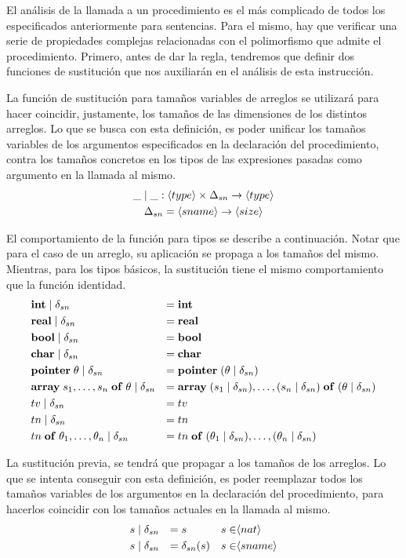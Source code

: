 \documentclass{article}
\begin{document}
El análisis de la llamada a un procedimiento es el más complicado de todos los especificados anteriormente para sentencias.
Para el mismo, hay que verificar una serie de propiedades complejas relacionadas con el polimorfismo que admite el procedimiento.
Primero, antes de dar la regla, tendremos que definir dos funciones de sustitución que nos auxiliarán en el análisis de esta instrucción.

La función de sustitución para tamaños variables de arreglos se utilizará para hacer coincidir, justamente, los tamaños de las dimensiones de los distintos arreglos.
Lo que se busca con esta definición, es poder unificar los tamaños variables de los argumentos especificados en la declaración del procedimiento, contra los tamaños concretos en los tipos de las expresiones pasadas como argumento en la llamada al mismo.
\begin{gather*}
\_ \mid \_ : \langle type \rangle \times \Delta_{sn} \rightarrow \langle type \rangle
\\
\Delta_{sn} = \langle sname \rangle \rightarrow \langle size \rangle
\end{gather*}

El comportamiento de la función para tipos se describe a continuación.
Notar que para el caso de un arreglo, su aplicación se propaga a los tamaños del mismo.
Mientras, para los tipos básicos, la sustitución tiene el mismo comportamiento que la función identidad.
\begin{align*}
&\mathbf{int} \mid \delta_{sn}
&=&\;
\mathbf{int}
\\
&\mathbf{real} \mid \delta_{sn}
&=&\;
\mathbf{real}
\\
&\mathbf{bool} \mid \delta_{sn}
&=&\;
\mathbf{bool}
\\
&\mathbf{char} \mid \delta_{sn}
&=&\;
\mathbf{char}
\\
&\mathbf{pointer} \; \theta \mid \delta_{sn}
&=&\;
\mathbf{pointer} \; (\theta \mid \delta_{sn})
\\
&\mathbf{array} \; s_1, \ldots, s_n \; \mathbf{of} \; \theta \mid \delta_{sn}
&=&\;
\mathbf{array} \; (s_1 \mid \delta_{sn}), \ldots, (s_n \mid \delta_{sn}) \; \mathbf{of} \; (\theta \mid \delta_{sn})
\\
&tv \mid \delta_{sn}
&=&\;
tv
\\
&tn \mid \delta_{sn}
&=&\;
tn
\\
&tn \; \mathbf{of} \; \theta_1, \ldots, \theta_n \mid \delta_{sn}
&=&\;
tn \; \mathbf{of} \; (\theta_1 \mid \delta_{sn}), \ldots, (\theta_n \mid \delta_{sn})
\end{align*}

La sustitución previa, se tendrá que propagar a los tamaños de los arreglos.
Lo que se intenta conseguir con esta definición, es poder reemplazar todos los tamaños variables de los argumentos en la declaración del procedimiento, para hacerlos coincidir con los tamaños actuales en la llamada al mismo.
\begin{align*}
&s \mid \delta_{sn}
&=&\;
s
&s \in &\langle nat \rangle
\\
&s \mid \delta_{sn}
&=&\;
\delta_{sn}(s)
&s \in &\langle sname \rangle
\end{align*}
\end{document}
